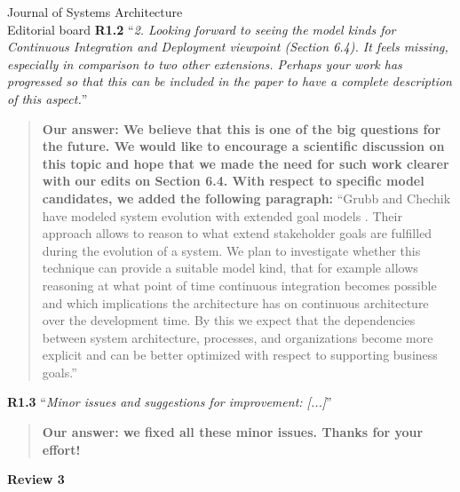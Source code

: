 \documentclass[a4paper,10pt]{letter}
\newcommand{\review}[1]{\hrulefill\par{\Large\textbf{Review #1}}}
\begin{document}
\begin{letter}{Journal of Systems Architecture\\
    Editorial board}
\textbf{R1.2} ``\textit{2. Looking forward to seeing the model kinds for Continuous Integration and Deployment viewpoint (Section 6.4). It feels missing, especially in comparison to two other extensions. Perhaps your work has progressed so that this can be included in the paper to have a complete description of this aspect.}''
\begin{quote}
\textbf{Our answer: We believe that this is one of the big questions for the future. We would like to encourage a scientific discussion on this topic and hope that we made the need for such work clearer with our edits on Section 6.4. With respect to specific model candidates, we added the following paragraph:} ``Grubb and Chechik have modeled system evolution with extended goal models \cite{Grubb2016}.
Their approach allows to reason to what extend stakeholder goals are fulfilled during the evolution of a system.
We plan to investigate whether this technique can provide a suitable model kind, that for example allows reasoning at what point of time continuous integration becomes possible and which implications the architecture has on continuous architecture over the development time. 
By this we expect that the dependencies between system architecture, processes, and organizations become more explicit and can be better optimized with respect to supporting business goals.''
\end{quote}

\textbf{R1.3} ``\textit{Minor issues and suggestions for improvement:
[...]}''
\begin{quote}
\textbf{Our answer: we fixed all these minor issues. Thanks for your effort!}
\end{quote}

\review{3}


\end{letter}
\end{document}
